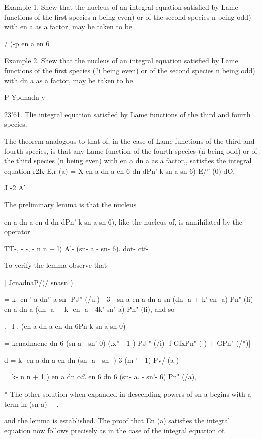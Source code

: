 {{{{{{{{Example 1. Shew that the nucleus of an integral equation satisfied by
Lame functions of the first species n being even) or of the second
species n being odd) with en a as a factor, may be taken to be

/  (-p en a en 6

Example 2. Shew that the nucleus of an integral equation satisfied by
Lame functions of the first species (?i being even) or of the second
species n being odd) with dn a as a factor, may be taken to be

P Ypdnadn y

23'61. Tlie integral equation satisfied by Lame functions of the third
and fourth species.

The theorem analogous to that of, in the case of Lame functions
of the third and fourth species, is that any Lame function of the
fourth species (n being odd) or of the third species (n being even)
with en a dn a as a factor,, satisfies the integral equation r2K E,r
(a) = X en a dn a en 6 dn dPn' k sn a sn 6) E/'' (0) dO.

J -2 A'

The preliminary lemma is that the nucleus

en a dn a en d dn dPn' k sn a sn 6), like the nucleus of, is
annihilated by the operator

TT-, - -, - n n + l) A'- (sn- a - sn- 6). dot- ctf-

To verify the lemma observe that

| JcnadnaP/(/ snasn )

= k- cn ' a dn'' a sn- PJ'' (/u.) - 3 - sn a en a dn a sn (dn- a + k'
en- a) Pn" (fi) - en a dn a (dn- a + k- en- a - 4k' sn" a) Pn" (fi),
and so

. \ I . (en a dn a en dn 6Pn k sn a sn 0)\

= kcnadnacne dn 6 (sn a - sn' 0) (,x'' - 1 ) PJ " (/i) -f GfxPn" ( ) +
GPn" (/*)]

d = k- en a dn a en dn (sn- a - sn- ) 3 (m-' - 1) Pv/ (a )

= k- n n + 1 ) en a dn o£ en 6 dn 6 (sn- a. - sn'- 6) Pn" (/a),

* The other solution when expanded in descending powers of sn a begins
with a term in (sn a)- - .

%
%

and the lemma is established. The proof that En (a) satisfies the
integral equation now follows precisely as in the case of the integral
equation of.

}}}}}}}}
